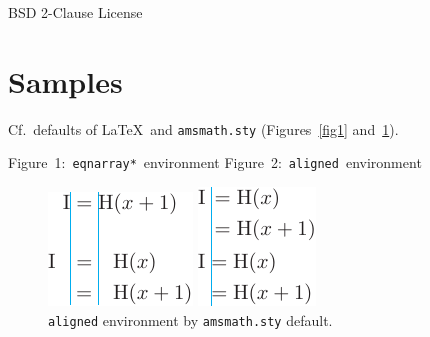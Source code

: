 \documentclass{article}
\begin{document}
BSD 2-Clause License

\section{Samples}

Cf.\ defaults of \LaTeX{}\ and \texttt{amsmath.sty} (Figures~\ref{fig1} and~\ref{fig2}).

\hbox{Figure 1: \texttt{eqnarray*} environment}%
\hbox{Figure 2: \texttt{aligned} environment}%
\begin{figure}
 \centering
 \begin{minipage}[t]{\wd9}
  \centering
  \includegraphics{eqnarray-org.pdf}
  \caption{\texttt{eqnarray*} environment by \LaTeX{}\ default.}
  \label{fig1}
 \end{minipage}\qquad
 \begin{minipage}[t]{\wd8}
  \centering
  \includegraphics{aligned-org.pdf}
  \caption{\texttt{aligned} environment by \texttt{amsmath.sty} default.}
  \label{fig2}
 \end{minipage}
\end{figure}

\noindent
\begin{center}
 \makeatletter{}\makeatother
 \qquad
\end{center}
\end{document}
